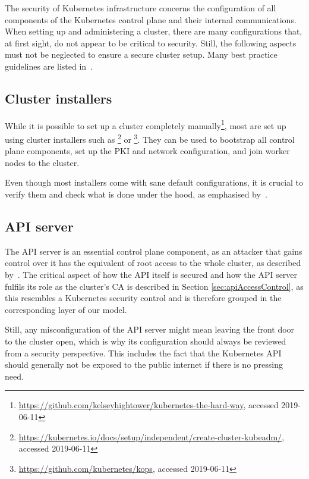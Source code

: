 The security of Kubernetes infrastructure concerns the configuration of all components of the Kubernetes control plane and their internal communications. When setting up and administering a cluster, there are many configurations that, at first sight, do not appear to be critical to security. Still, the following aspects must not be neglected to ensure a secure cluster setup. Many best practice guidelines are listed in~\textcite{kubernetessecurity}.

\subsection{Cluster installers}

While it is possible to set up a cluster completely manually\footnote{\url{https://github.com/kelseyhightower/kubernetes-the-hard-way}, accessed 2019-06-11}, most are set up using cluster installers such as \footnote{\url{https://kubernetes.io/docs/setup/independent/create-cluster-kubeadm/}, accessed 2019-06-11} or \footnote{\url{https://github.com/kubernetes/kops}, accessed 2019-06-11}. They can be used to bootstrap all control plane components, set up the \ac{PKI} and network configuration, and join worker nodes to the cluster.

Even though most installers come with sane default configurations, it is crucial to verify them and check what is done under the hood, as emphasised by~\textcite{securingkubernetesConfK8SClusterComponents}. 

\subsection{API server}

The API server is an essential control plane component, as an attacker that gains control over it has the equivalent of root access to the whole cluster, as described by~\cite{kubernetessecurity}. The critical aspect of how the API itself is secured and how the API server fulfils its role as the cluster's \ac{CA} is described in Section \ref{sec:apiAccessControl}, as this resembles a Kubernetes security control and is therefore grouped in the corresponding layer of our model. 

Still, any misconfiguration of the API server might mean leaving the front door to the cluster open, which is why its configuration should always be reviewed from a security perspective. This includes the fact that the Kubernetes API should generally not be exposed to the public internet if there is no pressing need.

